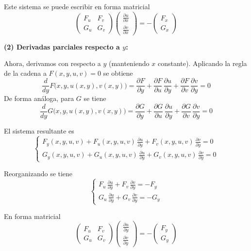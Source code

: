\documentclass{article}
\begin{document}
Este sistema se puede escribir en forma matricial
\[
\begin{pmatrix}
F_u & F_v \\
G_u & G_v
\end{pmatrix}
\begin{pmatrix}
\frac{\partial u}{\partial x} \\
\frac{\partial v}{\partial x}
\end{pmatrix}
=
-\begin{pmatrix}
F_x \\
G_x
\end{pmatrix}
\]

\medskip
\noindent \textbf{(2) Derivadas parciales respecto a \( y \):}

Ahora, derivamos con respecto a \( y \) (manteniendo \( x \) constante). Aplicando la regla de la cadena a \( F(x,y,u,v)=0 \) se obtiene
\[
\frac{d}{dy}F\bigl(x,y,u(x,y),v(x,y)\bigr)
=\frac{\partial F}{\partial y}+ \frac{\partial F}{\partial u}\,\frac{\partial u}{\partial y}+ \frac{\partial F}{\partial v}\,\frac{\partial v}{\partial y}=0
\]
De forma análoga, para \( G \) se tiene
\[
\frac{d}{dy}G\bigl(x,y,u(x,y),v(x,y)\bigr)
=\frac{\partial G}{\partial y}+ \frac{\partial G}{\partial u}\,\frac{\partial u}{\partial y}+ \frac{\partial G}{\partial v}\,\frac{\partial v}{\partial y}=0
\]

El sistema resultante es
\[
\begin{cases}
F_y(x,y,u,v)+ F_u(x,y,u,v)\,\frac{\partial u}{\partial y}+ F_v(x,y,u,v)\,\frac{\partial v}{\partial y}=0 \\
G_y(x,y,u,v)+ G_u(x,y,u,v)\,\frac{\partial u}{\partial y}+ G_v(x,y,u,v)\,\frac{\partial v}{\partial y}=0
\end{cases}
\]

Reorganizando se tiene
\[
\begin{cases}
F_u\,\frac{\partial u}{\partial y}+ F_v\,\frac{\partial v}{\partial y}=-F_y \\
G_u\,\frac{\partial u}{\partial y}+ G_v\,\frac{\partial v}{\partial y}=-G_y
\end{cases}
\]

En forma matricial
\[
\begin{pmatrix}
F_u & F_v \\
G_u & G_v
\end{pmatrix}
\begin{pmatrix}
\frac{\partial u}{\partial y} \\
\frac{\partial v}{\partial y}
\end{pmatrix}
=
-\begin{pmatrix}
F_y \\
G_y
\end{pmatrix}
\]
\end{document}
